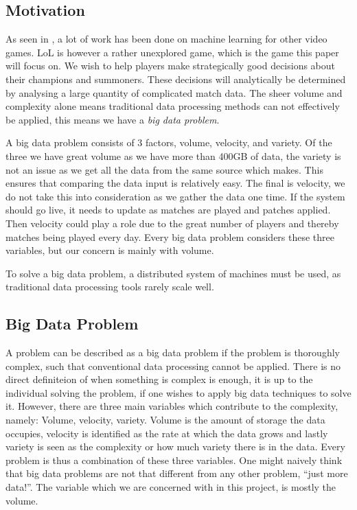 \subsection{Motivation}\label{sec:motivation}
As seen in , a lot of work has been done on machine learning for other video games. LoL is however a rather unexplored game, which is the game this paper will focus on. We wish to help players make strategically good decisions about their champions and summoners. These decisions will analytically be determined by analysing a large quantity of complicated match data. The sheer volume and complexity alone means traditional data processing methods can not effectively be applied, this means we have a \emph{big data problem}. 

A big data problem consists of 3 factors, volume, velocity, and variety. Of the three we have great volume as we have more than 400GB of data, the variety is not an issue as we get all the data from the same source which makes. This ensures that comparing the data input is relatively easy. The final is velocity, we do not take this into consideration as we gather the data one time. If the system should go live, it needs to update as matches are played and patches applied. Then velocity could play a role due to the great number of players and thereby matches being played every day. Every big data problem considers these three variables, but our concern is mainly with volume.

To solve a big data problem, a distributed system of machines must be used, as traditional data processing tools rarely scale well. 

\subsection{Big Data Problem}
A problem can be described as a big data problem if the problem is thoroughly complex, such that conventional data processing cannot be applied. There is no direct definiteion of when something is complex is enough, it is up to the individual solving the problem, if one wishes to apply big data techniques to solve it. However, there are three main variables which contribute to the complexity, namely: Volume, velocity, variety. Volume is the amount of storage the data occupies, velocity is identified as the rate at which the data grows and lastly variety is seen as the complexity or how much variety there is in the data. 
Every problem is thus a combination of these three variables. One might naively think that big data problems are not that different from any other problem, ``just more data!''. The variable which we are concerned with in this project, is mostly the volume. 

